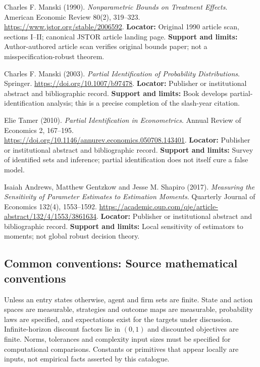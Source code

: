 \documentclass[11pt,a4paper]{article}
\begin{document}
\begin{enumerate}[label={[\textnormal{S}\arabic*]},leftmargin=*]

\item Charles F. Manski (1990). \emph{Nonparametric Bounds on Treatment Effects}. American Economic Review 80(2), 319–323. \url{https://www.jstor.org/stable/2006592}. \textbf{Locator:} Original 1990 article scan, sections I–II; canonical JSTOR article landing page. \textbf{Support and limits:} Author-authored article scan verifies original bounds paper; not a misspecification-robust theorem.

\item Charles F. Manski (2003). \emph{Partial Identification of Probability Distributions}. Springer. \url{https://doi.org/10.1007/b97478}. \textbf{Locator:} Publisher or institutional abstract and bibliographic record. \textbf{Support and limits:} Book develops partial-identification analysis; this is a precise completion of the slash-year citation.

\item Elie Tamer (2010). \emph{Partial Identification in Econometrics}. Annual Review of Economics 2, 167–195. \url{https://doi.org/10.1146/annurev.economics.050708.143401}. \textbf{Locator:} Publisher or institutional abstract and bibliographic record. \textbf{Support and limits:} Survey of identified sets and inference; partial identification does not itself cure a false model.

\item Isaiah Andrews, Matthew Gentzkow and Jesse M. Shapiro (2017). \emph{Measuring the Sensitivity of Parameter Estimates to Estimation Moments}. Quarterly Journal of Economics 132(4), 1553–1592. \url{https://academic.oup.com/qje/article-abstract/132/4/1553/3861634}. \textbf{Locator:} Publisher or institutional abstract and bibliographic record. \textbf{Support and limits:} Local sensitivity of estimators to moments; not global robust decision theory.

\end{enumerate}

\subsection*{Common conventions: Source mathematical conventions}

Unless an entry states otherwise, agent and firm sets are finite. State and action spaces are measurable, strategies and outcome maps are measurable, probability laws are specified, and expectations exist for the targets under discussion. Infinite-horizon discount factors lie in $(0,1)$ and discounted objectives are finite. Norms, tolerances and complexity input sizes must be specified for computational comparisons. Constants or primitives that appear locally are inputs, not empirical facts asserted by this catalogue.
\end{document}

